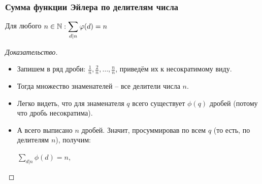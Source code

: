 \begin{frame}[t]
    \frametitle{\bf \normalsize Сумма функции Эйлера по делителям числа}
    
    \setcounter{theorem}{16}
    \begin{theorem}[]
        Для любого $n \in \mathbb{N}: \displaystyle \sum_{d \mid n} \varphi(d) = n$
    \end{theorem}

    \begin{proof}[Доказательство]
        \begin{itemize}
            \item Запишем в ряд дроби: $\frac{1}{n}, \frac{2}{n}, \dots, \frac{n}{n}$, приведём их к несократимому виду.
            \item Тогда множество знаменателей -- все делители числа $n$.
            \item Легко видеть, что для знаменателя $q$ всего существует $\phi(q)$ дробей (потому что дробь несократима).
            \item А всего выписано $n$ дробей. Значит, просуммировав по всем $q$ (то есть, по делителям $n$), получим:
                \begin{center}
                    $\displaystyle\sum_{d | n} \phi(d) = n$, \qedsymbol
                \end{center}
        \end{itemize}
    \end{proof}
\end{frame}



